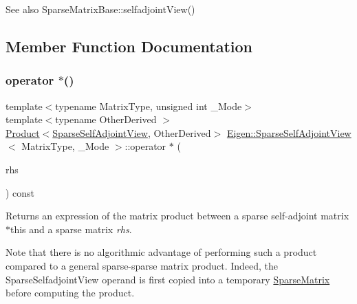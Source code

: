 \begin{DoxySeeAlso}{See also}
Sparse\+Matrix\+Base\+::selfadjoint\+View() 
\end{DoxySeeAlso}


\subsection{Member Function Documentation}
\mbox{\label{class_eigen_1_1_sparse_self_adjoint_view_a7faf4a36a9275b9ed9bd0efe930f5523}} 
\subsubsection{\texorpdfstring{operator $\ast$()}{operator *()}\hspace{0.1cm}{\footnotesize\ttfamily [1/2]}}
{\footnotesize\ttfamily template$<$typename Matrix\+Type, unsigned int \+\_\+\+Mode$>$ \\
template$<$typename Other\+Derived $>$ \\
\mbox{\hyperlink{class_eigen_1_1_product}{Product}}$<$\mbox{\hyperlink{class_eigen_1_1_sparse_self_adjoint_view}{Sparse\+Self\+Adjoint\+View}}, Other\+Derived$>$ \mbox{\hyperlink{class_eigen_1_1_sparse_self_adjoint_view}{Eigen\+::\+Sparse\+Self\+Adjoint\+View}}$<$ Matrix\+Type, \+\_\+\+Mode $>$\+::operator $\ast$ (\begin{DoxyParamCaption}\item[{const \mbox{\hyperlink{class_eigen_1_1_sparse_matrix_base}{Sparse\+Matrix\+Base}}$<$ Other\+Derived $>$ \&}]{rhs }\end{DoxyParamCaption}) const\hspace{0.3cm}{\ttfamily [inline]}}

\begin{DoxyReturn}{Returns}
an expression of the matrix product between a sparse self-\/adjoint matrix {\ttfamily $\ast$this} and a sparse matrix {\itshape rhs}.
\end{DoxyReturn}
Note that there is no algorithmic advantage of performing such a product compared to a general sparse-\/sparse matrix product. Indeed, the Sparse\+Selfadjoint\+View operand is first copied into a temporary \mbox{\hyperlink{class_eigen_1_1_sparse_matrix}{Sparse\+Matrix}} before computing the product. \mbox{\label{class_eigen_1_1_sparse_self_adjoint_view_ab1fca90b37ab93a0d417d29e7490b238}} 
